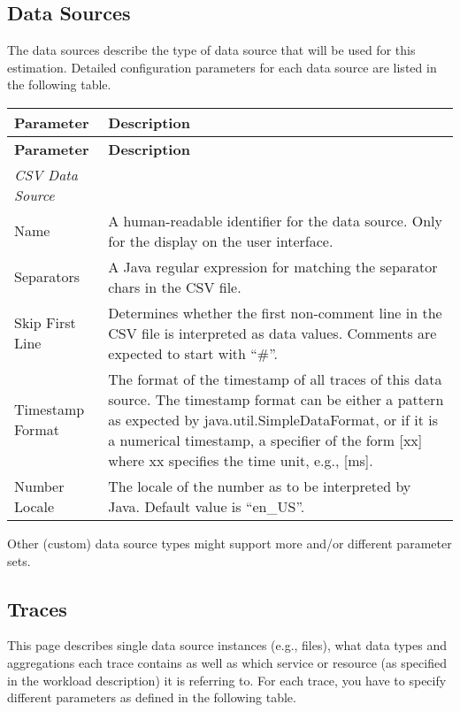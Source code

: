 \subsection{Data Sources}
The data sources describe the type of data source that will be used for this estimation.
Detailed configuration parameters for each data source are listed in the following table.

   \begin{tabularx}{\textwidth}{lX}
        \toprule
        \textbf{Parameter} & \textbf{Description} \\
        \midrule
        \endfirsthead %
        \toprule
        \textbf{Parameter} & \textbf{Description} \\
        \midrule
        \endhead %
        \bottomrule
        \endfoot
        \textit{CSV Data Source} \\
        Name & A human-readable identifier for the data source.
        Only for the display on the user interface. \\
       Separators & A Java regular expression for matching the separator
       chars in the CSV file. \\
       Skip First Line & Determines whether the first non-comment line in
       the CSV file is interpreted as data values. Comments
       are expected to start with ``\#''.
\\
       Timestamp Format & The format of the timestamp of all traces of this data source. The timestamp format can be either a pattern as expected by java.util.SimpleDataFormat, or if it is a numerical timestamp, a specifier of the form [xx] where xx specifies the time unit, e.g., [ms]. \\
       Number Locale & The locale of the number as to be interpreted by Java. Default value is ``en\_US''.\\
    \end{tabularx}

Other (custom) data source types might support more and/or different parameter sets.

\subsection{Traces}
This page describes single data source instances (e.g., files), what data types and aggregations each trace contains as well as which service or resource (as specified in the workload description) it is referring to.
For each trace, you have to specify different parameters as defined in the following table.

